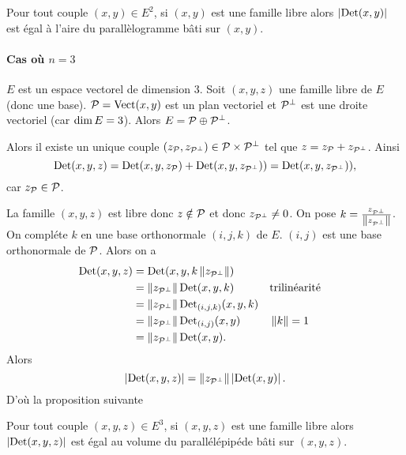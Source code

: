     \begin{prop}
      Pour tout couple \((x,y) \in E^2\), si \((x,y)\) est une famille libre alors \(\abs{\Det(x,y)}\) est égal à l'aire du parallèlogramme bâti sur \((x,y)\).
    \end{prop}

    \paragraph{Cas où \(n=3\)}

    \(E\) est un espace vectorel de dimension 3. Soit \((x,y,z)\) une famille libre de \(E\) (donc une base). \(\P=\VectEngendre(x,y)\) est un plan vectoriel et \(\P^\perp\) est une droite vectoriel (car \(\Dim E=3\)). Alors \(E =\P \oplus\P^\perp\).

    Alors il existe un unique couple \((z_\P,z_{\P^\perp}) \in \P \times \P^\perp\) tel que \(z=z_\P +z_{\P^\perp}\). Ainsi
    \begin{equation}
      \Det(x,y,z) = \Det(x,y,z_\P) +\Det(x,y,z_{\P^\perp})) = \Det(x,y,z_{\P^\perp})),
    \end{equation}
    car \(z_\P \in \P\).

    La famille \((x,y,z)\) est libre donc \(z \notin \P\) et donc \(z_{\P^\perp} \neq 0\). On pose \(k=\frac{z_{\P^\perp}}{\norme{z_{\P^\perp}}}\). On compléte \(k\) en une base orthonormale \((i,j,k)\) de \(E\). \((i,j)\) est une base orthonormale de \(\P\). Alors on a
    \begin{align}
      \Det(x,y,z) &= \Det(x,y,k\norme{z_{\P^\perp}}) \\
                  &=\norme{z_{\P^\perp}}\Det(x,y,k) && \text{trilinéarité}\\
                  &=\norme{z_{\P^\perp}}\Det_{(i,j,k)}(x,y,k)\\
                  &=\norme{z_{\P^\perp}}\Det_{(i,j)}(x,y) && \norme{k}=1\\
                  &=\norme{z_{\P^\perp}}\Det(x,y).
    \end{align}
    Alors
    \begin{equation}
      \abs{\Det(x,y,z)} = \norme{z_{\P^\perp}}\abs{\Det(x,y)}.
    \end{equation}
    D'où la proposition suivante
    \begin{prop}
      Pour tout couple \((x,y,z) \in E^3\), si \((x,y,z)\) est une famille libre alors \(\abs{\Det(x,y,z)}\) est égal au volume du parallélépipéde bâti sur \((x,y,z)\).
    \end{prop}

